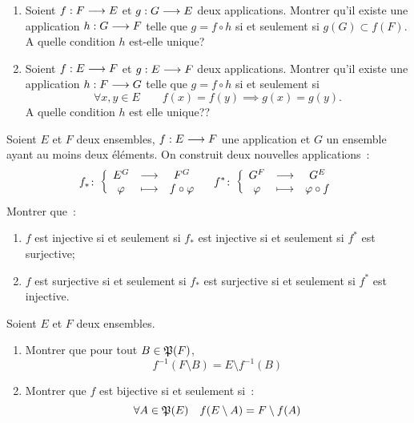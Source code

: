 \begin{exercice}
  \begin{enumerate}
    \item Soient \(f:F \longrightarrow E\) et \(g:G \longrightarrow E\) deux 
      applications. Montrer qu'il existe une application 
      \(h:G \longrightarrow F\) telle que \(g = f \circ h\) si et seulement 
      si \(g(G) \subset f(F)\). A quelle condition \(h\) est-elle unique?
    \item Soient \(f:E \longrightarrow F\) et \(g:E \longrightarrow F\) deux 
      applications. Montrer qu'il existe une application 
      \(h:F \longrightarrow G\) telle que \(g = f \circ h\) si et seulement 
      si 
      \begin{equation}
        \forall x,y \in E \qquad f(x) = f(y) \implies g(x) = g(y).
      \end{equation}
      A quelle condition \(h\) est elle unique??
  \end{enumerate}
\end{exercice}

\begin{exercice}
  Soient \(E\) et \(F\) deux ensembles, \(f:E \longrightarrow F\) une 
  application et \(G\) un ensemble ayant au moins deux éléments. On construit 
  deux nouvelles applications~:
  \begin{equation}
    f_{*}\colon \left\{\begin{array}{ccc} E^G & \longrightarrow &F^G\\ \varphi & \longmapsto & f \circ \varphi \end{array} \right. \quad 
    f^{*}\colon \left\{\begin{array}{ccc} G^F & \longrightarrow &G^E\\ \varphi & \longmapsto & \varphi \circ f \end{array} \right.
  \end{equation}
  Montrer que~:
  \begin{enumerate}
    \item \(f\) est injective si et seulement si \(f_{*}\) est injective si 
      et seulement si \(f^{*}\) est surjective;
    \item \(f\) est surjective si et seulement si \(f_{*}\) est surjective 
      si et seulement si \(f^{*}\) est injective.
  \end{enumerate}
\end{exercice}

\begin{exercice}
  Soient \(E\) et \(F\) deux ensembles.
  \begin{enumerate}
    \item Montrer que pour tout \(B \in \mathfrak{P}(F)\),
      \begin{equation}
        f^{-1}(F\setminus B) = E \setminus f^{-1}(B)
      \end{equation}
    \item Montrer que \(f\) est bijective si et seulement si~:
      \begin{equation}
        \forall A \in \mathfrak{P}(E) \quad f(E\setminus A) = F\setminus f(A)
      \end{equation}
  \end{enumerate}
\end{exercice}


